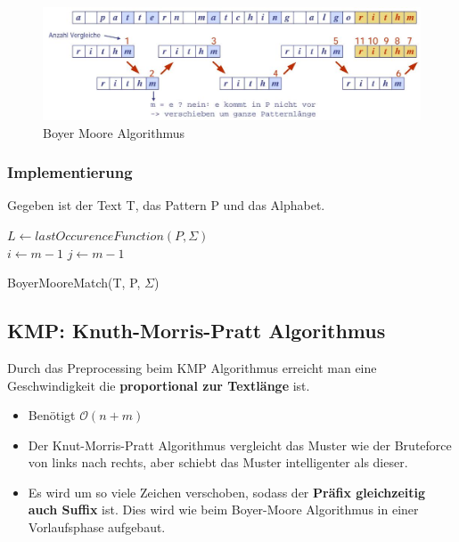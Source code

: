 \begin{figure}[h]
	\centering
	\includegraphics[width=0.9\linewidth]{images/boyer_moore_algorithm}
	\caption{Boyer Moore Algorithmus}
	\label{fig:boyermoorealgorithm}
\end{figure}

\subsubsection{Implementierung}
Gegeben ist der Text T, das Pattern P und das Alphabet. \hfill \\
\begin{algorithm}[H]
	$L \leftarrow lastOccurenceFunction(P, \Sigma)$ \\
	$i \leftarrow m -1$ 
	$j \leftarrow m -1$ 
	\caption{BoyerMooreMatch(T, P, $\Sigma$)}
\end{algorithm}

\clearpage

\subsection{KMP: Knuth-Morris-Pratt Algorithmus}
Durch das Preprocessing beim KMP Algorithmus erreicht man eine Geschwindigkeit die \textbf{proportional zur Textlänge} ist.
\begin{itemize}
	\item Benötigt $\mathcal{O}(n + m)$
	\item Der Knut-Morris-Pratt Algorithmus vergleicht das Muster wie der Bruteforce von links nach rechts, aber schiebt das Muster intelligenter als dieser.
	\item Es wird um so viele Zeichen verschoben, sodass der \textbf{Präfix gleichzeitig auch Suffix} ist. Dies wird wie beim Boyer-Moore Algorithmus in einer Vorlaufsphase aufgebaut.
\end{itemize}

